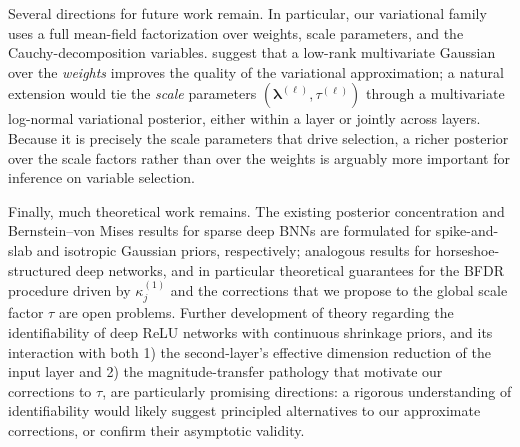 {Several directions for future work remain.  
In particular, our variational family uses a full mean-field factorization over
weights, scale parameters, and the Cauchy-decomposition variables.
\citet{ghosh_structured_2018} suggest that a low-rank multivariate
Gaussian over the \emph{weights} improves the quality of the
variational approximation; a natural extension would tie the
\emph{scale} parameters $(\bm\lambda^{(\ell)}, \tau^{(\ell)})$
through a multivariate log-normal variational posterior, either
within a layer or jointly across layers.  Because it is precisely
the scale parameters that drive selection, a richer posterior over
the scale factors rather than over the weights is arguably more important for
inference on variable selection.

Finally, much theoretical work remains.  The existing posterior
concentration and Bernstein--von Mises results for sparse deep BNNs
\citep{polson_posterior_2018, wang_uncertainty_2020,
liu_variable_2021} are formulated for spike-and-slab and isotropic
Gaussian priors, respectively; analogous results for
horseshoe-structured deep networks, and in particular theoretical
guarantees for the BFDR procedure driven by $\kappa_j^{(1)}$ and 
the corrections that we propose to the global scale factor $\tau$ are
open problems.  Further development of theory regarding 
the identifiability of deep ReLU networks with
continuous shrinkage priors, and its interaction with both
1) the second-layer's effective dimension reduction of the input layer 
and 2) the magnitude-transfer pathology that
motivate our corrections to $\tau$, are particularly
promising directions: a rigorous understanding of identifiability
would likely suggest principled alternatives to our approximate
corrections, or confirm their asymptotic validity.





}
